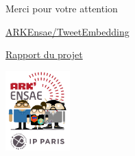 \documentclass[10pt,xcolor=table,color={dvipsnames,usenames},ignorenonframetext,usepdftitle=false,french]{beamer}
\begin{document}
\begin{frame}{Merci pour votre attention}
\protect\hypertarget{merci-pour-votre-attention}{}

\href{https://github.com/ARKEnsae/TweetEmbedding}{\faGithub{} ARKEnsae/TweetEmbedding}

\href{https://arkensae.github.io//TweetEmbedding/Redaction/Rapport_Final/Rapport.pdf}{\faEdit{} Rapport du projet}

\begin{center}
\includegraphics[width = 2.5cm]{img/LOGO-ENSAE.png}
\end{center}

\end{frame}
\end{document}
